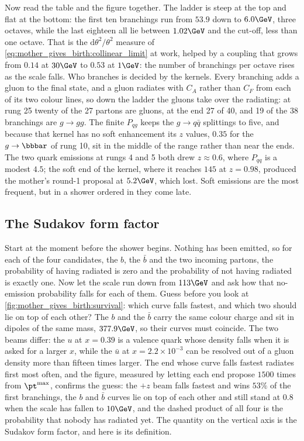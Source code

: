 Now read the table and the figure together. The ladder is steep at the top
and flat at the bottom: the first ten branchings run from $53.9$ down to
$6.0\GeV$, three octaves, while the last eighteen all lie between
$1.02\GeV$ and the cut-off, less than one octave. That is the
$\mathrm{d}\theta^2/\theta^2$ measure of
\cref{eq:mother_gives_birth:collinear_limit} at work, helped by a coupling
that grows from $0.14$ at $30\GeV$ to $0.53$ at $1\GeV$: the number of
branchings per octave rises as the scale falls. Who branches is decided by
the kernels. Every branching adds a gluon to the final state, and a gluon
radiates with $C_A$ rather than $C_F$ from each of its two colour lines, so
down the ladder the gluons take over the radiating: at rung 25 twenty of
the 27 partons are gluons, at the end 27 of 40, and 19 of the 38
branchings are $g\to gg$. The finite $P_{qg}$ keeps the $g\to q\bar q$
splittings to five, and because that kernel has no soft enhancement its
$z$ values, $0.35$ for the $g\to\bbbar$ of rung 10, sit in the middle of
the range rather than near the ends. The two quark emissions at rungs 4
and 5 both drew $z\approx0.6$, where $P_{qq}$ is a modest $4.5$; the soft
end of the kernel, where it reaches $145$ at $z=0.98$, produced the
mother's round-1 proposal at $5.2\GeV$, which lost. Soft emissions are the
most frequent, but in a shower ordered in \pt they come late.

\subsection{The Sudakov form factor}
\label{sec:mother_gives_birth:sudakov}

Start at the moment before the shower begins. Nothing has been emitted, so
for each of the four candidates, the $b$, the $\bar b$ and the two incoming
partons, the probability of having radiated is zero and the probability of
not having radiated is exactly one. Now let the scale run down from
$113\GeV$ and ask how that no-emission probability falls for each of them.
Guess before you look at \cref{fig:mother_gives_birth:survival}: which
curve falls fastest, and which two should lie on top of each other? The
$b$ and the $\bar b$ carry the same colour charge and sit in dipoles of the
same mass, $377.9\GeV$, so their curves must coincide. The two beams
differ: the $u$ at $x=0.39$ is a valence quark whose density falls when it
is asked for a larger $x$, while the $\bar u$ at $x=2.2\times10^{-3}$ can
be resolved out of a gluon density more than fifteen times larger. The end
whose curve falls fastest radiates first most often, and the figure,
measured by letting each end propose $1500$ times from $\pt^{\max}$,
confirms the guess: the $+z$ beam falls fastest and wins $53\%$ of the
first branchings, the $b$ and $\bar b$ curves lie on top of each other and
still stand at $0.8$ when the scale has fallen to $10\GeV$, and the dashed
product of all four is the probability that nobody has radiated yet. The
quantity on the vertical axis is the Sudakov form factor, and here is its
definition.

